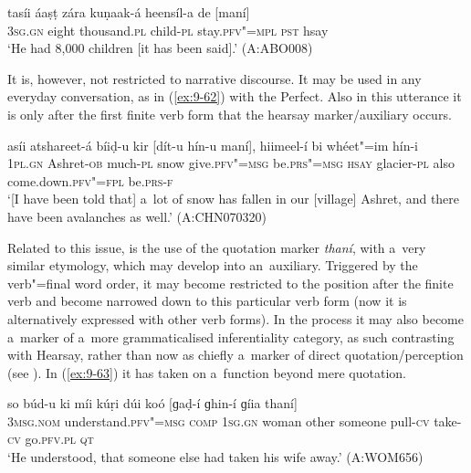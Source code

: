 \begin{exe}
\ex
\label{ex:9-61}
\gll tasíi áaṣṭ zára kuṇaak-á heensíl-a de [maní] \\
3\textsc{sg.gn} eight thousand.\textsc{pl} child-\textsc{pl} stay.\textsc{pfv"=mpl} \textsc{pst} hsay \\
\glt `He had 8,000 children [it has been said].' (A:ABO008)
\end{exe}

It is, however, not restricted to narrative discourse. It may be used in any everyday conversation, as in (\ref{ex:9-62}) with the Perfect. Also in this utterance it is only after the first finite verb form that the hearsay marker/auxiliary occurs.

\begin{exe}
\ex
\label{ex:9-62}
\gll asíi atshareet-á bíiḍ-u kir [dít-u hín-u maní], hiimeel-í bi whéet"=im hín-i \\
\textsc{1pl.gn} Ashret-\textsc{ob} much-\textsc{pl} snow give.\textsc{pfv"=msg} be.\textsc{prs"=msg} \textsc{hsay} glacier-\textsc{pl} also come.down.\textsc{pfv"=fpl} be.\textsc{prs-f} \\
\glt `[I have been told that] a~lot of snow has fallen in our [village] Ashret, and there have been avalanches as well.' (A:CHN070320)
\end{exe}

Related to this issue, is the use of the quotation marker \textit{thaní}, with a~very similar etymology, which may develop into an~auxiliary. Triggered by the verb"=final word order, it may become restricted to the position after the finite verb and become narrowed down to this particular verb form (now it is alternatively expressed with other verb forms). In the process it may also become a~marker of a~more grammaticalised inferentiality category, as such contrasting with Hearsay, rather than now as chiefly a~marker of direct quotation/perception (see ). In (\ref{ex:9-63}) it has taken on a~function beyond mere quotation.

\begin{exe}
\ex
\label{ex:9-63}
\gll so búd-u ki míi kúṛi dúi koó [ɡaḍ-í ɡhin-í ɡíia thaní]  \\
\textsc{3msg.nom} understand.\textsc{pfv"=msg} \textsc{comp} \textsc{1sg.gn} woman  other someone pull-\textsc{cv} take-\textsc{cv} go.\textsc{pfv.pl} \textsc{qt} \\
\glt `He understood, that someone else had taken his wife away.' (A:WOM656)
\end{exe}


